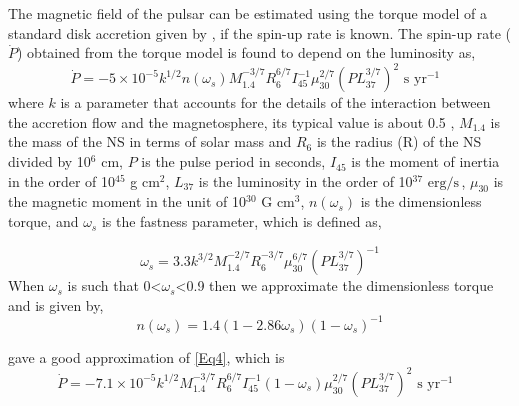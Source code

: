 \documentclass[12pt,a4paper,fleqn,usenatbib]{mnras}
\newcommand{\unilum}{$\text{erg}/\text{s}\,$}
\begin{document}
The magnetic field of the pulsar can be estimated using the torque model of a standard disk accretion given by \cite{1979ApJ...232..259G,1979ApJ...234..296G}, if the spin-up rate is known. The spin-up rate ($\dot{P}$) obtained from the torque model is found to depend on the luminosity as,
\begin{equation}
\dot{P} = -5\times 10^{-5}k^{1/2}n(\omega_{s})M_{1.4}^{-3/7}R_{6}^{6/7}I_{45}^{-1}\mu_{30}^{2/7}(PL_{37}^{3/7})^2 \mbox{ s yr$^{-1}$ }
\label{Eq4}
\end{equation}
where $k$ is a parameter that accounts for the details of the interaction between the accretion flow and the magnetosphere, its typical value is about 0.5 \citep{1979ApJ...232..259G}, $M_{1.4}$ is the mass of the NS in terms of solar mass and $R_{6}$ is the radius (R) of the NS divided by 10$^{6}$ cm, $P$ is the pulse period in seconds, $I_{45}$ is the moment of inertia in the order of 10$^{45}$ g cm$^{2}$, $L_{37}$ is the luminosity in the order of 10$^{37}$ \unilum, $\mu_{30}$ is the magnetic moment in the unit of 10$^{30}$ G cm$^{3}$, $n(\omega_{s})$ is the dimensionless torque, and $\omega_{s}$ is the fastness parameter, which is defined as,

\begin{equation}\omega_{s} = 3.3k^{3/2}M_{1.4}^{-2/7}R_{6}^{-3/7}\mu_{30}^{6/7} (PL_{37}^{3/7})^{-1}\end{equation}When $\omega_{s}$ is such that 0<$\omega_{s}$<0.9 then we approximate the dimensionless torque and is given by,
\begin{equation}
n(\omega_{s})=1.4(1-2.86\omega_{s})(1-\omega_{s})^{-1}
\end{equation}

\cite{2014MNRAS.437.3664H} gave a good approximation of \ref{Eq4}, which is
\begin{equation}\dot{P} = -7.1\times 10^{-5}k^{1/2}M_{1.4}^{-3/7}R_{6}^{6/7}I_{45}^{-1}(1-\omega_{s})\mu_{30}^{2/7}(PL_{37}^{3/7})^2 \mbox{ s yr$^{-1}$ }
\label{Eq7}
\end{equation}
\end{document}
